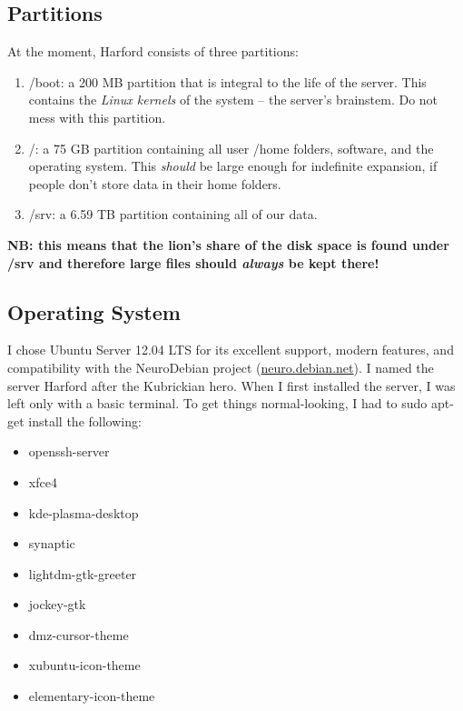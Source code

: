 \documentclass[final,titlepage,letterpaper,oneside,12pt]{article}
\renewcommand{\texttt}[2][BrickRed]{\textcolor{#1}{\ttfamily #2}}%
\begin{document}
\subsection{Partitions}

At the moment, Harford consists of three partitions: 

\begin{enumerate}
    \item{\texttt{/boot}: a 200 MB partition that is integral to the life of the server. This contains the \textit{Linux kernels} of the system -- the server's brainstem. Do not mess with this partition.}
    
    \item{\texttt{/}: a 75 GB partition containing all user \texttt{/home} folders, software, and the operating system. This \textit{should} be large enough for indefinite expansion, if people don't store data in their home folders.}
    
    \item{\texttt{/srv}: a 6.59 TB partition containing all of our data.}
\end{enumerate}


\begin{center}
\textbf{NB: this means that the lion's share of the disk space is found under \texttt{/srv} and therefore large files should \textit{always} be kept there!}
\end{center}

\subsection{Operating System}

I chose Ubuntu Server 12.04 LTS for its excellent support, modern features, and compatibility with the NeuroDebian project (\url{neuro.debian.net}). I named the server Harford after the Kubrickian hero. When I first installed the server, I was left only with a basic terminal. To get things normal-looking, I had to \texttt{sudo apt-get install} the following:

\noindent
\begin{small}
\begin{itemize} \itemsep-2pt
    \item{openssh-server}
    \item{xfce4}
    \item{kde-plasma-desktop}
    \item{synaptic}
    \item{lightdm-gtk-greeter}
    \item{jockey-gtk}
    \item{dmz-cursor-theme} 
    \item{xubuntu-icon-theme}
    \item{elementary-icon-theme}
\end{itemize}
\end{small}
\end{document}
